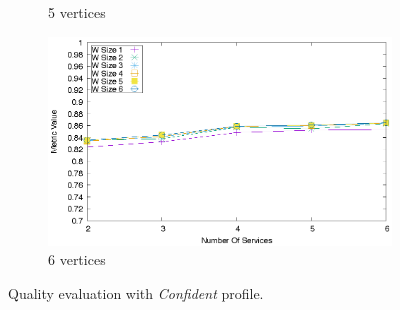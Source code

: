\begin{figure}[ht]
\begin{subfigure}{0.33\textwidth}
    \caption{5 vertices}
    \label{fig:third}
  \end{subfigure}
  \hfill
  \begin{subfigure}{0.33\textwidth}
    \includegraphics[width=\textwidth]{Images/graphs/quality_plot_average_n6.eps}
    \caption{6 vertices}
    \label{fig:third}
  \end{subfigure}
  \caption{ Quality evaluation with \textit{Confident} profile.}
  \label{fig:quality_window_good}
\end{figure}

